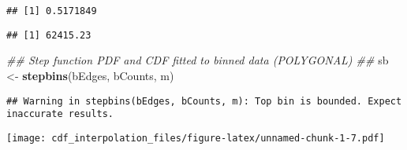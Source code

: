 \documentclass[]{article}
\newenvironment{Shaded}{\begin{snugshade}}{\end{snugshade}}
\newcommand{\CommentTok}[1]{\textcolor[rgb]{0.56,0.35,0.01}{\textit{#1}}}
\newcommand{\DataTypeTok}[1]{\textcolor[rgb]{0.13,0.29,0.53}{#1}}
\newcommand{\DecValTok}[1]{\textcolor[rgb]{0.00,0.00,0.81}{#1}}
\newcommand{\KeywordTok}[1]{\textcolor[rgb]{0.13,0.29,0.53}{\textbf{#1}}}
\newcommand{\NormalTok}[1]{#1}
\newcommand{\OperatorTok}[1]{\textcolor[rgb]{0.81,0.36,0.00}{\textbf{#1}}}
\newcommand{\OtherTok}[1]{\textcolor[rgb]{0.56,0.35,0.01}{#1}}
\newcommand{\StringTok}[1]{\textcolor[rgb]{0.31,0.60,0.02}{#1}}
\begin{document}
\begin{verbatim}
## [1] 0.5171849
\end{verbatim}

\begin{Shaded}
\end{Shaded}

\begin{verbatim}
## [1] 62415.23
\end{verbatim}

\begin{Shaded}
\begin{Highlighting}[]
\CommentTok{## Step function PDF and CDF fitted to binned data (POLYGONAL) ##}
\NormalTok{sb <-}\StringTok{ }\KeywordTok{stepbins}\NormalTok{(bEdges, bCounts, m)}
\end{Highlighting}
\end{Shaded}

\begin{verbatim}
## Warning in stepbins(bEdges, bCounts, m): Top bin is bounded. Expect inaccurate results.
\end{verbatim}

\begin{Shaded}
\end{Shaded}

\texttt{[image: cdf\_interpolation\_files/figure-latex/unnamed-chunk-1-7.pdf]}

\begin{Shaded}
\end{Shaded}
\end{document}
